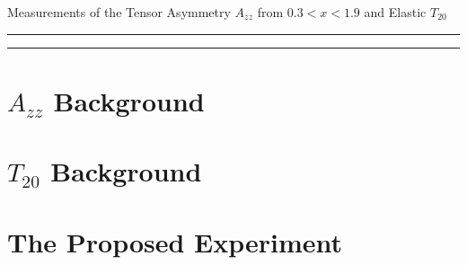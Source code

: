 \documentclass[12pt]{article}
\begin{document}
\linenumbers
\pagestyle{empty}
 
\begin{center}
 \LARGE{
  Measurements of the Tensor Asymmetry $A_{zz}$ from $0.3<x<1.9$ and Elastic $T_{20}$
 }
\end{center}
%
\hrule \vspace{.05cm}\hrule
%


\newpage

\begin{abstract}
  
\end{abstract}

\newpage


%


\clearpage


\tableofcontents


\pagestyle{plain}

\clearpage

%

\section{$A_{zz}$ Background}









\section{$T_{20}$ Background}



\section{The Proposed Experiment}


\end{document}
